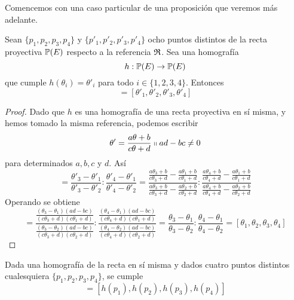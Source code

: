Comencemos con una caso particular de una proposición que veremos más adelante.
\begin{lem}
	Sean $\{p_1,p_2,p_3,p_4\}$ y $\{p'_1,p'_2,p'_3,p'_4\}$ ocho puntos distintos de la recta proyectiva $\mathbb{P}(E)$ respecto a la referencia $\mathfrak{R}$. Sea una homografía
	\[h:\mathbb{P}(E)\rightarrow \mathbb{P}(E)\]
	que cumple $h(\theta_i)=\theta'_i$ para todo $i\in\{1,2,3,4\}$. Entonces
	\begin{equation}
		[\theta_1,\theta_2,\theta_3,\theta_4]=[\theta'_1,\theta'_2,\theta'_3,\theta'_4]
	\end{equation}
\end{lem}
\begin{proof}
	Dado que $h$ es una homografía de una recta proyectiva en sí misma, y hemos tomado la misma referencia, podemos escribir
	\begin{equation*}
		\theta'=\frac{a\theta+b}{c\theta +d}\shortparallel ad-bc\not=0
	\end{equation*}
	para determinados $a,b,c$ y $d$. Así
	\begin{equation*}
		[\theta'_1,\theta'_2,\theta'_3,\theta'_4]=\frac{\theta'_3-\theta'_1}{\theta'_3-\theta'_2}:\frac{\theta'_4-\theta'_1}{\theta'_4-\theta'_2}=\frac{\frac{a\theta_3+b}{c\theta_3 +d}-\frac{a\theta_1+b}{c\theta_1 +d}}{\frac{a\theta_3+b}{c\theta_3 +d}-\frac{a\theta_2+b}{c\theta_2 +d}}:\frac{\frac{a\theta_4+b}{c\theta_4 +d}-\frac{a\theta_1+b}{c\theta_1 +d}}{\frac{a\theta_4+b}{c\theta_4 +d}-\frac{a\theta_2+b}{c\theta_2+d}}
	\end{equation*}
	Operando se obtiene
	\begin{equation*}
		[\theta'_1,\theta'_2,\theta'_3,\theta'_4]=\frac{\frac{(\theta_3-\theta_1)(ad-bc)}{(c\theta_3+d)(c\theta_1+d)}}{\frac{(\theta_3-\theta_2)(ad-bc)}{(c\theta_3+d)(c\theta_2+d)}}:\frac{\frac{(\theta_4-\theta_1)(ad-bc)}{(c\theta_4+d)(c\theta_1+d)}}{\frac{(\theta_4-\theta_2)(ad-bc)}{(c\theta_4+d)(c\theta_2+d)}}=\frac{\theta_3-\theta_1}{\theta_3-\theta_2}:\frac{\theta_4-\theta_1}{\theta_4-\theta_2}=[\theta_1,\theta_2,\theta_3,\theta_4]
	\end{equation*}
\end{proof}
\begin{cor}
	Dada una homografía de la recta en sí misma y dados cuatro puntos distintos cualesquiera $\{p_1,p_2,p_3,p_4\}$, se cumple
	\begin{equation}
	[p_1,p_2,p_3,p_4]=[h(p_1),h(p_2),h(p_3),h(p_4)]
	\end{equation} 
\end{cor}
